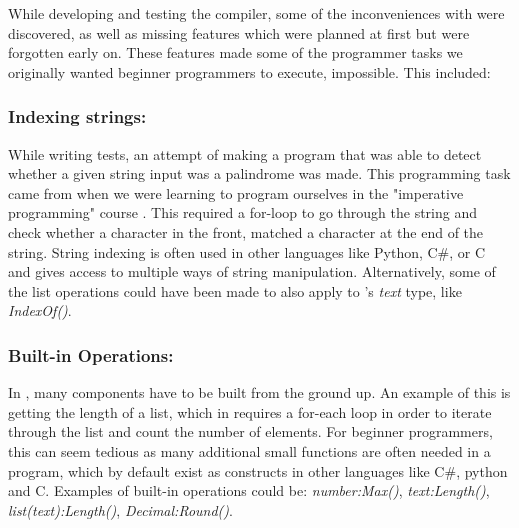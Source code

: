 
While developing and testing the \lang compiler, some of the inconveniences with \lang were discovered, as well as missing features which were planned at first but were forgotten early on. These features made some of the programmer tasks we originally wanted beginner programmers to execute, impossible. This included:

\subsubsection{Indexing strings:}
While writing tests, an attempt of making a program that was able to detect whether a given string input was a palindrome was made. This programming task came from when we were learning to program ourselves in the "imperative programming" course \cite{C-CourseExercises}. This required a for-loop to go through the string and check whether a character in the front, matched a character at the end of the string. String indexing is often used in other languages like Python, C\#, or C and gives access to multiple ways of string manipulation. Alternatively, some of the list operations could have been made to also apply to \lang's \textit{text} type, like \textit{IndexOf()}.
    
\subsubsection{Built-in Operations:} In \lang, many components have to be built from the ground up. An example of this is getting the length of a list, which in \lang requires a for-each loop in order to iterate through the list and count the number of elements. For beginner programmers, this can seem tedious as many additional small functions are often needed in a program, which by default exist as constructs in other languages like C\#, python and C. Examples of built-in operations could be: \textit{number:Max()}, \textit{text:Length()}, \textit{list(text):Length()}, \textit{Decimal:Round()}. 


